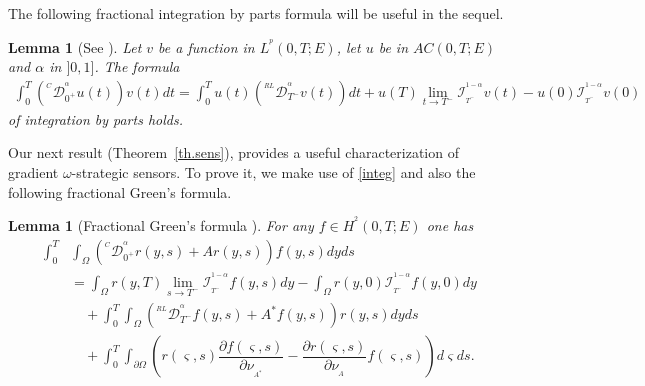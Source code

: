 \documentclass{article}
\newtheorem{lemma}[theorem]{Lemma}
\begin{document}
The following fractional integration by parts formula 
will be useful in the sequel.

\begin{lemma}[See \cite{frac.intg}]
\label{lem:FIBP}	
Let $v$ be a function in $L^{^p}(0,T;E)$, let $u$ be in $AC(0,T;E)$ 
and $\alpha$ in $]0,1]$. The formula 
\begin{equation}
\label{integ}
\begin{array}{lll}
\displaystyle\int_{0}^{T} \left({^{^C}\mathcal{D}_{0^+}^{^\alpha}}u(t)\right)v(t)dt 
= \displaystyle\int_{0}^{T} u(t)\left({^{^{RL}}\mathcal{D}_{T^-}^{^\alpha}} v(t)\right)dt
+ u(T)\lim\limits_{t\rightarrow T^-}
\mathcal{I}_{_{T^-}}^{^{1-\alpha}}v(t)
- u(0)\mathcal{I}_{_{T^-}}^{^{1-\alpha}}v(0)
\end{array}
\end{equation}
of integration by parts holds.
\end{lemma} 

Our next result (Theorem~\ref{th.sens}),
provides a useful characterization 
of gradient $\omega$-strategic sensors.
To prove it, we make use of \eqref{integ} and also
the following fractional Green's formula.

\begin{lemma}[Fractional Green's formula \cite{zguaid.2021}]	
\label{lem:FGF}
For any $f \in H^{^2}\left(0,T;E\right)$ one has
\begin{equation}
\label{green}
\begin{split}
\displaystyle\int_{0}^{T}
&\int_{\Omega}\left({^{^C}\mathcal{D}_{0^+}^{^\alpha}}r(y,s) 
+ Ar(y,s)\right)f(y,s)dyds\\ 
&=\displaystyle \int_{\Omega}r(y,T)\lim\limits_{s\rightarrow T^-}
\mathcal{I}_{_{T^-}}^{^{1-\alpha}}f(y,s)dy 
- \displaystyle \int_{\Omega}r(y,0)\mathcal{I}_{_{T^-}}^{^{1-\alpha}}f(y,0)dy\\
&\quad + \displaystyle\int_{0}^{T}\int_{\Omega}\left({^{^{RL}}\mathcal{D}_{T^-}^{^\alpha}} 
f(y,s) + A^*f(y,s)\right)r(y,s)dyds \\	
& \quad + \displaystyle\int_{0}^{T}\int_{\partial\Omega}\left(r(\varsigma,s)
\dfrac{\partial f(\varsigma,s)}{\partial\nu_{_{A^*}}} 
- \dfrac{\partial r(\varsigma,s)}{\partial\nu_{_{A}}} 
f(\varsigma,s)\right)d\varsigma ds.
\end{split}
\end{equation}
\end{lemma}
\end{document}

